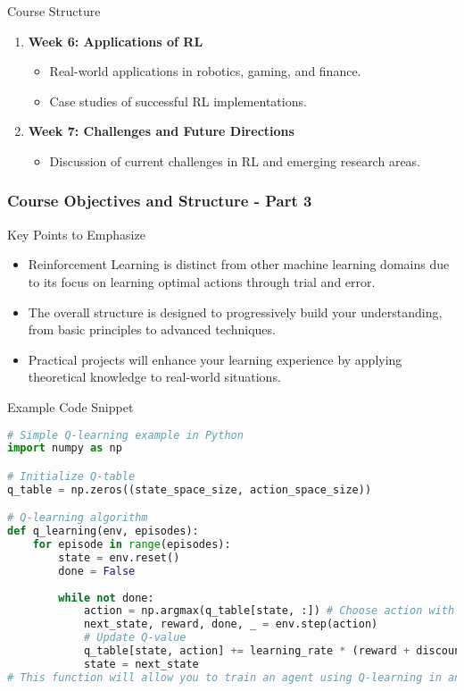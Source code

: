 \documentclass[aspectratio=169]{beamer}
\begin{document}
\begin{frame}[fragile]
\begin{block}{Course Structure}
\begin{enumerate}
      \item \textbf{Week 6: Applications of RL}
        \begin{itemize}
          \item Real-world applications in robotics, gaming, and finance.
          \item Case studies of successful RL implementations.
        \end{itemize}
      \item \textbf{Week 7: Challenges and Future Directions}
        \begin{itemize}
          \item Discussion of current challenges in RL and emerging research areas.
        \end{itemize}
    \end{enumerate}
  \end{block}
\end{frame}

\begin{frame}[fragile]
  \frametitle{Course Objectives and Structure - Part 3}

  \begin{block}{Key Points to Emphasize}
    \begin{itemize}
      \item Reinforcement Learning is distinct from other machine learning domains due to its focus on learning optimal actions through trial and error.
      \item The overall structure is designed to progressively build your understanding, from basic principles to advanced techniques.
      \item Practical projects will enhance your learning experience by applying theoretical knowledge to real-world situations.
    \end{itemize}
  \end{block}

  \begin{block}{Example Code Snippet}
    \begin{lstlisting}[language=Python]
# Simple Q-learning example in Python
import numpy as np

# Initialize Q-table
q_table = np.zeros((state_space_size, action_space_size))

# Q-learning algorithm
def q_learning(env, episodes):
    for episode in range(episodes):
        state = env.reset()
        done = False
        
        while not done:
            action = np.argmax(q_table[state, :]) # Choose action with highest Q-value
            next_state, reward, done, _ = env.step(action)
            # Update Q-value
            q_table[state, action] += learning_rate * (reward + discount_factor * np.max(q_table[next_state, :]) - q_table[state, action])
            state = next_state
# This function will allow you to train an agent using Q-learning in an environment specified by `env`.
    \end{lstlisting}
  \end{block}
\end{frame}
\end{document}
